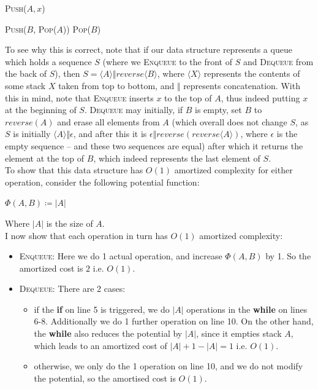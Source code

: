 \documentclass[a4paper,11pt]{scrartcl}
\begin{document}
\begin{algorithmic}[1]
    \State \textsc{Push}($A, x$)
\EndFunction

            \State \textsc{Push}($B$, \textsc{Pop}($A$))
        \EndWhile
    \EndIf
    \State \Return \textsc{Pop}($B$)
\EndFunction
\end{algorithmic}

To see why this is correct, note that if our data structure represents a queue which holds a sequence $S$ (where we \textsc{Enqueue} to the front of $S$ and \textsc{Dequeue} from the back of $S$), then $S = \langle A \rangle \Vert reverse\langle B \rangle$, where $\langle X \rangle$ represents the contents of some stack $X$ taken from top to bottom, and $\Vert$ represents concatenation. With this in mind, note that \textsc{Enqueue} inserts $x$ to the top of $A$, thus indeed putting $x$ at the beginning of $S$. \textsc{Dequeue} may initially, if $B$ is empty, set $B$ to $reverse(A)$ and erase all elements from $A$ (which overall does not change $S$, as $S$ is initially $\langle A \rangle \Vert \epsilon$, and after this it is $\epsilon \Vert reverse (reverse \langle A \rangle )$, where $\epsilon$ is the empty sequence -- and these two sequences are equal) after which it returns the element at the top of $B$, which indeed represents the last element of $S$. \\
To show that this data structure has $O(1)$ amortized complexity for either operation, consider the following potential function:

$\Phi(A, B) \coloneqq |A|$

Where $|A|$ is the size of $A$. \\
I now show that each operation in turn has $O(1)$ amortized complexity:

\begin{itemize}
    \item \textsc{Enqueue}: Here we do 1 actual operation, and increase $\Phi(A, B)$ by 1. So the amortized cost is $2$ i.e. $O(1)$.
    \item \textsc{Dequeue}: There are 2 cases:
        \begin{itemize}
            \item if the \textbf{if} on line 5 is triggered, we do $|A|$ operations in the \textbf{while} on lines 6-8. Additionally we do 1 further operation on line 10. On the other hand, the \textbf{while} also reduces the potential by $|A|$, since it empties stack $A$, which leads to an amortized cost of $|A| + 1 - |A| = 1$ i.e. $O(1)$.
            \item otherwise, we only do the 1 operation on line 10, and we do not modify the potential, so the amortised cost is $O(1)$.
        \end{itemize}
\end{itemize}
\end{document}
